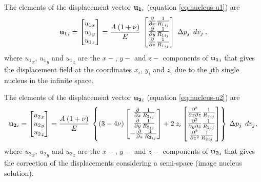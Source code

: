 \documentclass[journal abbreviation, manuscript]{copernicus}
\begin{document}
The elements  of the displacement vector ${\bf{u_{1}}}_{i}$ (equation \ref{eq:nucleus-u1}) are
\begin{equation}
{\bf{u_{1}}}_{i}  = 
\begin{bmatrix} 
{u_{1}}_x \\
{u_{1}}_y \\
{u_{1}}_z
\end{bmatrix}
 = \frac{A  \: (1 + \nu)}{E} \: 
\begin{bmatrix} 
\frac{\partial }{\partial x} {\frac{1}{{R_1}_{ij}}}  \\
\frac{\partial }{\partial y} {\frac{1}{{R_1}_{ij}}}  \\
\frac{\partial }{\partial z} {\frac{1}{{R_1}_{ij}}} 
\end{bmatrix}
 \: \Delta p_{j} \: \:dv_j \:  ,  
\label{eq:nucleus-u1-vector}
\end{equation}
where ${u_{1}}_x$, ${u_{1}}_y$ and ${u_{1}}_z$ are the $x-$, $y-$  and $z-$ components
of  ${\bf{u_{1}}}_{i} $ that gives the displacement field at the coordinates $x_i$, $y_i$  and $z_i$  due to the $j$th single nucleus in the infinite space.

The elements  of the displacement vector ${\bf{u_{2}}}_{i} $ (equation \ref{eq:nucleus-u2}) are
\begin{equation}
{\bf{u_{2}}}_{i}  = 
\begin{bmatrix} 
{u_{2}}_x \\
{u_{2}}_y \\
{u_{2}}_z
\end{bmatrix}
 = \frac{A  \: (1 + \nu)}{E} \: \left\{   (3  - 4 \nu)
\begin{bmatrix} 
  \: \frac{\partial }{\partial x} {\frac{1}{{R_2}_{ij}}}  \\
  \: \frac{\partial }{\partial y} {\frac{1}{{R_2}_{ij}}}  \\
 - \frac{\partial }{\partial z} {\frac{1}{{R_2}_{ij}}}  
\end{bmatrix}
+ 2 \: z_{i}
\begin{bmatrix} 
\frac{\partial^{2}  }{\partial x \partial z} {\frac{1}{{R_2}_{ij}}} \\
\frac{\partial^{2} }{\partial y \partial z} {\frac{1}{{R_2}_{ij}}} \\
\frac{\partial^{2} }{\partial z^{2}} {\frac{1}{{R_2}_{ij}}} 
\end{bmatrix}
\right\}
\: \Delta p_{j} \: \:dv_j,
\label{eq:nucleus-u2-vector}
\end{equation}
where ${u_{2}}_x$, ${u_{2}}_y$ and ${u_{2}}_z$ are the $x-$, $y-$  and $z-$ components
of  ${\bf{u_{2}}}_{i} $ that gives the correction of the displacements considering  a semi-space (image nucleus solution).
\end{document}
